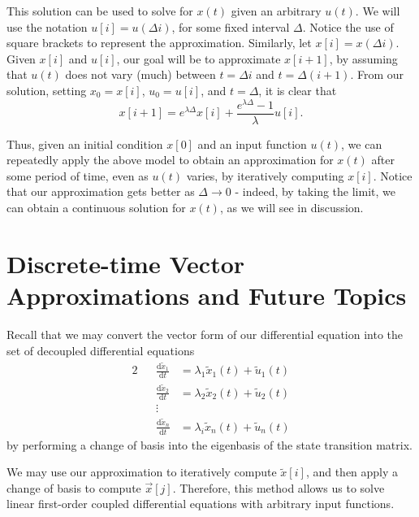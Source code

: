 \documentclass[letterpaper]{article}
\theoremstyle{remark}
\renewcommand{\tilde}[1]{\widetilde{#1}}
\newcommand{\dt}{\mathrm{d}t}
\newcommand{\diff}{\mathrm{d}}
\newcommand{\eqn}[1]{\begin{alignat*}{2}#1\end{alignat*}}
\begin{document}
This solution can be used to solve for $x(t)$ given an arbitrary $u(t)$. We will use the notation $u[i] = u(\Delta i)$, for some fixed interval $\Delta$. Notice the use of square brackets to represent the approximation. Similarly, let $x[i] = x(\Delta i)$. Given $x[i]$ and $u[i]$, our goal will be to approximate $x[i + 1]$, by assuming that $u(t)$ does not vary (much) between $t = \Delta i$ and $t = \Delta(i+1)$. From our solution, setting $x_0 = x[i]$, $u_0 = u[i]$, and $t = \Delta$, it is clear that
\[
    x[i + 1] = e^{\lambda \Delta}x[i] + \frac{e^{\lambda \Delta} - 1}{\lambda} u[i].
\]

Thus, given an initial condition $x[0]$ and an input function $u(t)$, we can repeatedly apply the above model to obtain an approximation for $x(t)$ after some period of time, even as $u(t)$ varies, by iteratively computing $x[i]$. Notice that our approximation gets better as $\Delta \to 0$ - indeed, by taking the limit, we can obtain a continuous solution for $x(t)$, as we will see in discussion.

\section{Discrete-time Vector Approximations and Future Topics}
Recall that we may convert the vector form of our differential equation into the set of decoupled differential equations
\eqn{
    && \frac{\diff \tilde{x}_1}{\dt} &= \lambda_1 \tilde{x}_1(t) + \tilde{u}_1(t) \\
    && \frac{\diff \tilde{x}_2}{\dt} &= \lambda_2 \tilde{x}_2(t) + \tilde{u}_2(t) \\
    && \vdots \\
    && \frac{\diff \tilde{x}_n}{\dt} &= \lambda_i \tilde{x}_n(t) + \tilde{u}_n(t)
}
by performing a change of basis into the eigenbasis of the state transition matrix.

We may use our approximation to iteratively compute $\tilde{x}[i]$, and then apply a change of basis to compute $\vec{x}[j]$. Therefore, this method allows us to solve linear first-order coupled differential equations with arbitrary input functions.
\end{document}
